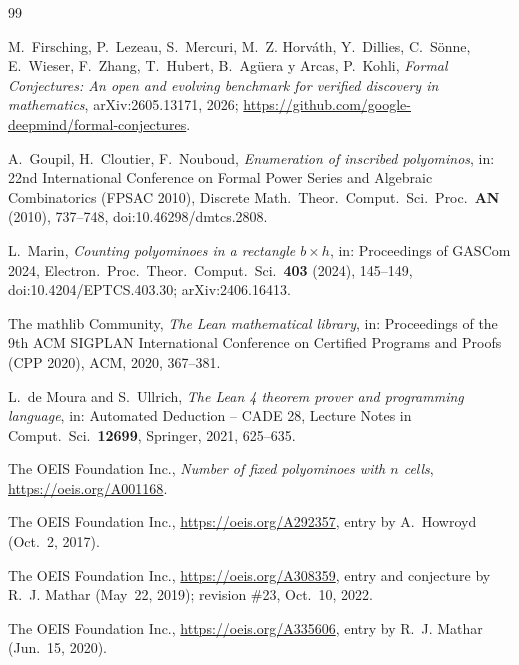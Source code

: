 \documentclass[11pt]{amsart}
\theoremstyle{plain}
\theoremstyle{definition}
\begin{document}
{\small
\begin{thebibliography}{99}

M.~Firsching, P.~Lezeau, S.~Mercuri, M.~Z. Horv\'ath, Y.~Dillies, C.~S\"onne, E.~Wieser, F.~Zhang, T.~Hubert, B.~Ag\"uera y Arcas, P.~Kohli, \emph{Formal Conjectures: An open and evolving benchmark for verified discovery in mathematics}, arXiv:2605.13171, 2026; \url{https://github.com/google-deepmind/formal-conjectures}.

A.~Goupil, H.~Cloutier, F.~Nouboud, \emph{Enumeration of inscribed polyominos}, in: 22nd International Conference on Formal Power Series and Algebraic Combinatorics (FPSAC 2010), Discrete Math.\ Theor.\ Comput.\ Sci.\ Proc.\ \textbf{AN} (2010), 737--748, doi:10.46298/dmtcs.2808.

L.~Marin, \emph{Counting polyominoes in a rectangle $b\times h$}, in: Proceedings of GASCom 2024, Electron.\ Proc.\ Theor.\ Comput.\ Sci.\ \textbf{403} (2024), 145--149, doi:10.4204/EPTCS.403.30; arXiv:2406.16413.

The mathlib Community, \emph{The Lean mathematical library}, in: Proceedings of the 9th ACM SIGPLAN International Conference on Certified Programs and Proofs (CPP 2020), ACM, 2020, 367--381.

L.~de Moura and S.~Ullrich, \emph{The Lean 4 theorem prover and programming language}, in: Automated Deduction -- CADE 28, Lecture Notes in Comput.\ Sci.\ \textbf{12699}, Springer, 2021, 625--635.

The OEIS Foundation Inc., \emph{Number of fixed polyominoes with $n$ cells}, \url{https://oeis.org/A001168}.

The OEIS Foundation Inc., \url{https://oeis.org/A292357}, entry by A.~Howroyd (Oct.~2, 2017).

The OEIS Foundation Inc., \url{https://oeis.org/A308359}, entry and conjecture by R.~J. Mathar (May~22, 2019); revision \#23, Oct.~10, 2022.

The OEIS Foundation Inc., \url{https://oeis.org/A335606}, entry by R.~J. Mathar (Jun.~15, 2020).

\end{thebibliography}
}
\end{document}
